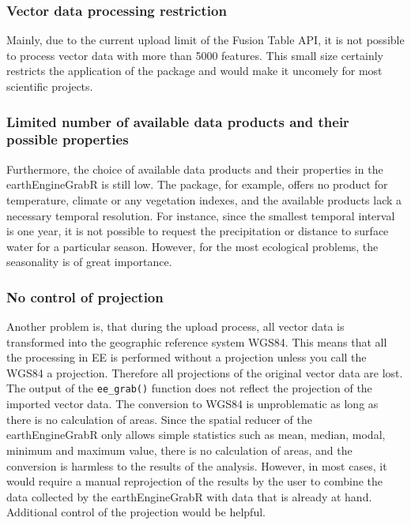 \subsubsection{Vector data processing restriction}

Mainly, due to the current upload limit of the Fusion Table API, it is not possible to process vector data with more than 5000 features. This small size certainly restricts the application of the package and would make it uncomely for most scientific projects. 

\subsubsection{Limited number of available data products and their possible properties}

Furthermore, the choice of available data products and their properties in the earthEngineGrabR is still low. The package, for example, offers no product for temperature, climate or any vegetation indexes, and the available products lack a necessary temporal resolution. For instance, since the smallest temporal interval is one year, it is not possible to request the precipitation or distance to surface water for a particular season. However, for the most ecological problems, the seasonality is of great importance.

\subsubsection{No control of projection}

Another problem is, that during the upload process, all vector data is transformed into the geographic reference system WGS84. This means that all the processing in EE is performed without a projection unless you call the WGS84 a projection. Therefore all projections of the original vector data are lost. The output of the \texttt{ee\_grab()} function does not reflect the projection of the imported vector data. The conversion to WGS84 is unproblematic as long as there is no calculation of areas. Since the spatial reducer of the earthEngineGrabR only allows simple statistics such as mean, median, modal, minimum and maximum value, there is no calculation of areas, and the conversion is harmless to the results of the analysis. However, in most cases, it would require a manual reprojection of the results by the user to combine the data collected by the earthEngineGrabR with data that is already at hand. Additional control of the projection would be helpful.

